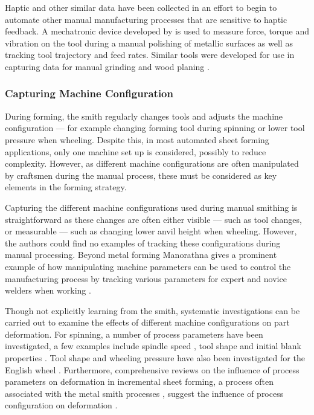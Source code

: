 Haptic and other similar data have been collected in an effort to begin to automate other manual manufacturing processes that are sensitive to haptic feedback. A mechatronic device developed by \cite{Kalt2016TowardsOperation} is used to measure force, torque and vibration on the tool during a manual polishing of metallic surfaces as well as tracking tool trajectory and feed rates. Similar tools were developed for use in capturing data for manual grinding \citep{Phan2018InstrumentationWorkpiece} and wood planing \citep{Montebelli2015OnTasks}.


\subsubsection{Capturing Machine Configuration} \label{sec:capturingmachineconfig}
During forming, the smith regularly changes tools and adjusts the machine configuration --- for example changing forming tool during spinning or lower tool pressure when wheeling. Despite this, in most automated sheet forming applications, only one machine set up is considered, possibly to reduce complexity. However, as different machine configurations are often manipulated by craftsmen during the manual process, these must be considered as key elements in the forming strategy.

Capturing the different machine configurations used during  manual smithing is straightforward as these changes are often either visible --- such as tool changes, or measurable --- such as changing lower anvil height when wheeling. However, the authors could find no examples of tracking these configurations during manual processing. Beyond metal forming Manorathna gives a prominent example of how manipulating machine parameters can be used to control the manufacturing process by tracking various parameters for expert and novice welders when working \citep{Manorathna2017HumanAutomation}. 

Though not explicitly learning from the smith, systematic investigations can be carried out to examine the effects of different machine configurations on part deformation. For spinning, a number of process parameters have been investigated, a few examples include spindle speed \citep{Sugar2016AnalysisSteels,Essa2010OptimizationAnalysis}, tool shape \citep{El-Khabeery1991OnCups,Essa2010OptimizationAnalysis} and initial blank properties \citep{Watson2015InvestigationMethod}. Tool shape and wheeling pressure have also been investigated for the English wheel \citep{Bowen2021NumericalProcess}. Furthermore, comprehensive reviews on the influence of process parameters on deformation in incremental sheet forming, a process often associated with the metal smith processes \citep{Music2012TheTools}, suggest the influence of process configuration on deformation \citep{Gatea2016ReviewForming,Gohil2021ReviewProcess}.

